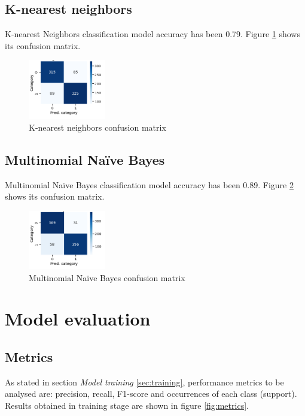 \subsection{K-nearest neighbors}

K-nearest Neighbors classification model accuracy has been 0.79. Figure \ref{fig:knn_cfm} shows its confusion matrix.
\begin{figure}[H]
	\centering
	\includegraphics[width=0.3\textwidth]{figs/knn_cfm.png}
	\caption{K-nearest neighbors confusion matrix}
	\label{fig:knn_cfm}
\end{figure}

\subsection{Multinomial Naïve Bayes}

Multinomial Naïve Bayes classification model accuracy has been 0.89. Figure \ref{fig:mnb_cfm} shows its confusion matrix.
\begin{figure}[H]
	\centering
	\includegraphics[width=0.3\textwidth]{figs/mnb_cfm.png}
	\caption{Multinomial Naïve Bayes confusion matrix}
	\label{fig:mnb_cfm}
\end{figure}

\section{Model evaluation}

\subsection{Metrics}

As stated in section \textit{Model training} \ref{sec:training}, performance metrics to be analysed are: precision, recall, F1-score and occurrences of each class (support). Results obtained in training stage are shown in figure \ref{fig:metrics}.

